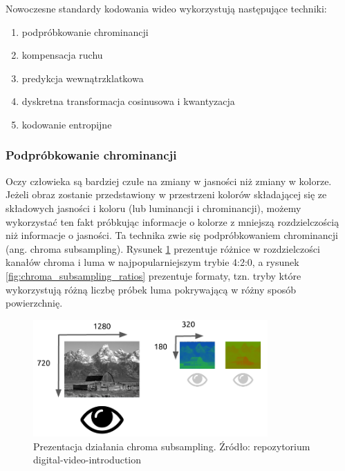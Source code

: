 Nowoczesne standardy kodowania wideo wykorzystują następujące techniki:

\begin{enumerate}
    \item podpróbkowanie chrominancji
    \item kompensacja ruchu
    \item predykcja wewnątrzklatkowa
    \item dyskretna transformacja cosinusowa i kwantyzacja
    \item kodowanie entropijne
\end{enumerate}

\subsubsection{Podpróbkowanie chrominancji}

Oczy człowieka są bardziej czułe na zmiany w jasności niż zmiany w kolorze. Jeżeli obraz
zostanie przedstawiony w przestrzeni kolorów składającej się ze składowych jasności i koloru (lub
luminancji i chrominancji), możemy wykorzystać ten fakt próbkując informacje o kolorze z mniejszą
rozdzielczością niż informacje o jasności. Ta technika zwie się podpróbkowaniem chrominancji (ang.
chroma subsampling). Rysunek \ref{fig:chroma_subsampling_resolution} prezentuje różnice w
rozdzielczości kanałów chroma i luma w najpopularniejszym trybie 4:2:0, a rysunek
\ref{fig:chroma_subsampling_ratios} prezentuje formaty, tzn. tryby które wykorzystują różną liczbę
próbek luma pokrywającą w różny sposób powierzchnię.

\begin{figure}[H]
    \centering
    \includegraphics[width=0.8\textwidth]{img/rozdzial2/ycbcr_subsampling_resolution}
    \caption{}
    \caption[Prezentacja działania chroma subsampling]{Prezentacja działania chroma subsampling. Źródło: repozytorium digital-video-introduction}
    \label{fig:chroma_subsampling_resolution}
\end{figure}

